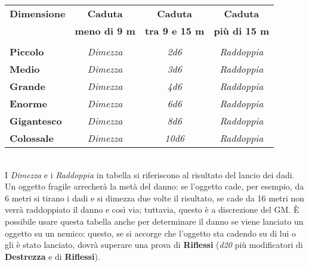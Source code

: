 {\begin{description}
				\begin{table}[h!]
					\begin{center}
						\label{tab:table1}
						\begin{tabular}{lccc} %
							\textbf{Dimensione} & \textbf{Caduta} & \textbf{Caduta} & \textbf{Caduta}\\
							 & \textbf{meno di 9 m} & \textbf{tra 9 e 15 m} & \textbf{più di 15 m} \\
							\hline\\
							\textbf{Piccolo} & \textit{Dimezza} & \textit{2d6} & \textit{Raddoppia}\\
							\textbf{Medio} & \textit{Dimezza} & \textit{3d6} & \textit{Raddoppia}\\
							\textbf{Grande} & \textit{Dimezza} & \textit{4d6} & \textit{Raddoppia}\\
							\textbf{Enorme} & \textit{Dimezza} & \textit{6d6} & \textit{Raddoppia}\\
							\textbf{Gigantesco} & \textit{Dimezza} & \textit{8d6} & \textit{Raddoppia}\\
							\textbf{Colossale} & \textit{Dimezza} & \textit{10d6} & \textit{Raddoppia}\\
						\end{tabular}
					\end{center}
				\end{table}\\
			I \textit{Dimezza} e i \textit{Raddoppia} in tabella si riferiscono al risultato del lancio dei dadi. Un oggetto fragile arrecherà la metà del danno: se l'oggetto cade, per esempio, da 6 metri si tirano i dadi e si dimezza due volte il risultato, se cade da 16 metri non verrà raddoppiato il danno e così via; tuttavia, questo è a discrezione del GM. È possibile usare questa tabella anche per determinare il danno se viene lanciato un oggetto su un nemico: questo, se si accorge che l'oggetto sta cadendo su di lui o gli è stato lanciato, dovrà superare una prova di \textbf{Riflessi} (\textit{d20} più modificatori di \textbf{ Destrezza} e di \textbf{Riflessi}).
		\end{description}}
	
